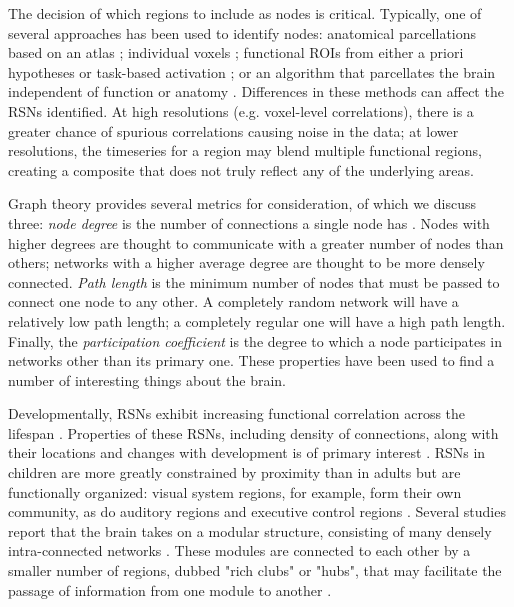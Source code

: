 The decision of which regions to include as nodes is critical. Typically, one of several approaches has been used to identify nodes: anatomical parcellations based on an atlas \cite{Supekar2008, Liu2008, Lynall2010}; individual voxels \cite{Fair2007}; functional ROIs from either a priori hypotheses or task-based activation \cite{VandenHeuvel2010}; or an algorithm that parcellates the brain independent of function or anatomy \cite{Goni2014}.  Differences in these methods can affect the RSNs identified. At high resolutions (e.g. voxel-level correlations), there is a greater chance of spurious correlations causing noise in the data; at lower resolutions, the timeseries for a region may blend multiple functional regions, creating a composite that does not truly reflect any of the underlying areas. 

Graph theory provides several metrics for consideration, of which we discuss three: \textit{node degree} is the number of connections a single node has \cite{Sporns2013}. Nodes with higher degrees are thought to communicate with a greater number of nodes than others; networks with a higher average degree are thought to be more densely connected. \textit{Path length} is the minimum number of nodes that must be passed to connect one node to any other. A completely random network will have a relatively low path length; a completely regular one will have a high path length. Finally, the \textit{participation coefficient} is the degree to which a node participates in networks other than its primary one. These properties have been used to find a number of interesting things about the brain. 

Developmentally, RSNs exhibit increasing functional correlation across the lifespan \cite{Kesler2013, Uddin2010}. Properties of these RSNs, including density of connections, along with their locations and changes with development is of primary interest  \cite{Cole2014, Dosenbach2007, Fair2009}. RSNs in children are more greatly constrained by proximity than in adults but are functionally organized: visual system regions, for example, form their own community, as do auditory regions and executive control regions \cite{Seeley2007}. Several studies report that the brain takes on a modular structure, consisting of many densely intra-connected networks \cite{Bullmore2009, Fair2009, Supekar2009, Dosenbach2007}. These modules are connected to each other by a smaller number of regions, dubbed "rich clubs" or "hubs", that may facilitate the passage of information from one module to another \cite{Power2013, Bullmore2012}. 

